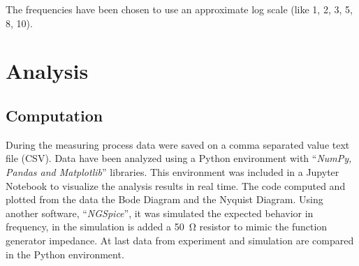 \documentclass[a4paper, twocolumn]{article}
\begin{document}
The frequencies have been chosen to use an approximate log scale (like 1, 2, 3, 5, 8, 10). 

\section{Analysis}

\subsection{Computation}

During the measuring process data were saved on a comma separated value text file (CSV). Data have been analyzed using a Python environment with ``\emph{NumPy, Pandas and Matplotlib}'' libraries. This environment was included in a Jupyter Notebook to visualize the analysis results in real time. The code computed and plotted from the data the Bode Diagram and the Nyquist Diagram. Using another software, ``\emph{NGSpice}'', it was simulated the expected behavior in frequency, in the simulation is added a \SI{50}{\ohm} resistor to mimic the function generator impedance. At last data from experiment and simulation are compared in the Python environment.
    
\end{document}
